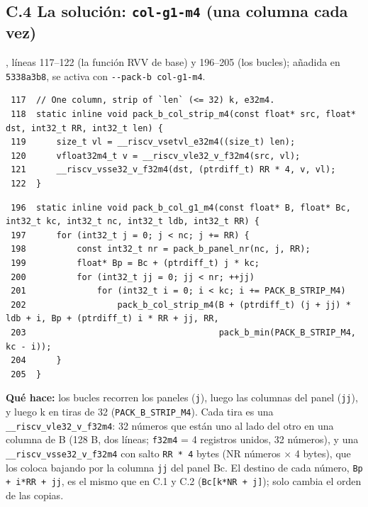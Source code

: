 \documentclass[10pt,a4paper]{article}
\begin{document}
\subsection*{C.4 La solución: \texttt{col-g1-m4} (una columna cada vez)}
, líneas 117--122 (la función RVV de base) y 196--205 (los bucles);
añadida en \texttt{5338a3b8}, se activa con \texttt{-{}-pack-b col-g1-m4}.
{\footnotesize\begin{verbatim}
 117  // One column, strip of `len` (<= 32) k, e32m4.
 118  static inline void pack_b_col_strip_m4(const float* src, float* dst, int32_t RR, int32_t len) {
 119      size_t vl = __riscv_vsetvl_e32m4((size_t) len);
 120      vfloat32m4_t v = __riscv_vle32_v_f32m4(src, vl);
 121      __riscv_vsse32_v_f32m4(dst, (ptrdiff_t) RR * 4, v, vl);
 122  }
\end{verbatim}}
{\scriptsize\begin{verbatim}
 196  static inline void pack_b_col_g1_m4(const float* B, float* Bc, int32_t kc, int32_t nc, int32_t ldb, int32_t RR) {
 197      for (int32_t j = 0; j < nc; j += RR) {
 198          const int32_t nr = pack_b_panel_nr(nc, j, RR);
 199          float* Bp = Bc + (ptrdiff_t) j * kc;
 200          for (int32_t jj = 0; jj < nr; ++jj)
 201              for (int32_t i = 0; i < kc; i += PACK_B_STRIP_M4)
 202                  pack_b_col_strip_m4(B + (ptrdiff_t) (j + jj) * ldb + i, Bp + (ptrdiff_t) i * RR + jj, RR,
 203                                      pack_b_min(PACK_B_STRIP_M4, kc - i));
 204      }
 205  }
\end{verbatim}}

\textbf{Qué hace:} los bucles recorren los paneles (\texttt{j}), luego las columnas del panel (\texttt{jj}), y luego k en tiras de 32
(\texttt{PACK\_B\_STRIP\_M4}). Cada tira es una \texttt{\_\_riscv\_vle32\_v\_f32m4}: 32 números que están uno al lado del otro en una
columna de B (128 B, dos líneas; \texttt{f32m4} = 4 registros unidos, 32 números), y una \texttt{\_\_riscv\_vsse32\_v\_f32m4} con
salto \texttt{RR * 4} bytes (NR números $\times$ 4 bytes), que los coloca bajando por la columna \texttt{jj} del panel Bc. El destino de
cada número, \texttt{Bp + i*RR + jj}, es el mismo que en C.1 y C.2 (\texttt{Bc[k*NR + j]}); solo cambia el orden de las copias.
\end{document}

